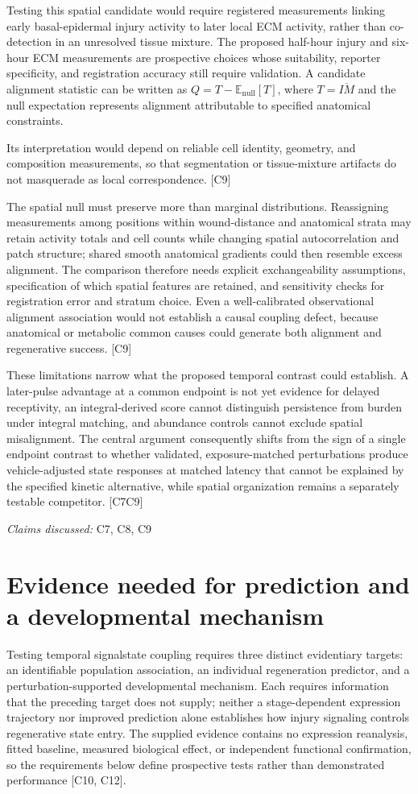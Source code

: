 \documentclass[11pt]{article}
\begin{document}
Testing this spatial candidate would require registered measurements linking early basal-epidermal injury activity to later local ECM activity, rather than co-detection in an unresolved tissue mixture. The proposed half-hour injury and six-hour ECM measurements are prospective choices whose suitability, reporter specificity, and registration accuracy still require validation. A candidate alignment statistic can be written as $Q=T-\mathbb{E}_{\mathrm{null}}[T]$, where $T=\overline{IM}$ and the null expectation represents alignment attributable to specified anatomical constraints.

Its interpretation would depend on reliable cell identity, geometry, and composition measurements, so that segmentation or tissue-mixture artifacts do not masquerade as local correspondence. [C9]

The spatial null must preserve more than marginal distributions. Reassigning measurements among positions within wound-distance and anatomical strata may retain activity totals and cell counts while changing spatial autocorrelation and patch structure; shared smooth anatomical gradients could then resemble excess alignment. The comparison therefore needs explicit exchangeability assumptions, specification of which spatial features are retained, and sensitivity checks for registration error and stratum choice. Even a well-calibrated observational alignment association would not establish a causal coupling defect, because anatomical or metabolic common causes could generate both alignment and regenerative success. [C9]

These limitations narrow what the proposed temporal contrast could establish. A later-pulse advantage at a common endpoint is not yet evidence for delayed receptivity, an integral-derived score cannot distinguish persistence from burden under integral matching, and abundance controls cannot exclude spatial misalignment. The central argument consequently shifts from the sign of a single endpoint contrast to whether validated, exposure-matched perturbations produce vehicle-adjusted state responses at matched latency that cannot be explained by the specified kinetic alternative, while spatial organization remains a separately testable competitor. [C7\textendash{}C9]

\textit{Claims discussed: }C7, C8, C9
\section{Evidence needed for prediction and a developmental mechanism}
Testing temporal signal\textendash{}state coupling requires three distinct evidentiary targets: an identifiable population association, an individual regeneration predictor, and a perturbation-supported developmental mechanism. Each requires information that the preceding target does not supply; neither a stage-dependent expression trajectory nor improved prediction alone establishes how injury signaling controls regenerative state entry. The supplied evidence contains no expression reanalysis, fitted baseline, measured biological effect, or independent functional confirmation, so the requirements below define prospective tests rather than demonstrated performance [C10, C12].
\end{document}
